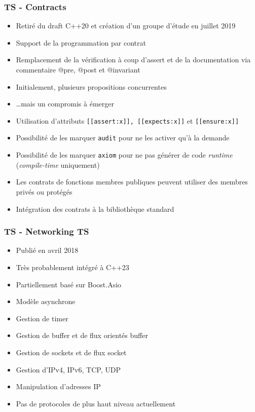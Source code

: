 \documentclass[C++.tex]{subfiles}
\begin{document}
\begin{frame}
	\frametitle{TS - Contracts}
	\begin{itemize}
		\item Retiré du draft C++20 et création d'un groupe d'étude en juillet 2019


		\item Support de la programmation par contrat
		\item Remplacement de la vérification à coup d'assert et de la documentation via commentaire @pre, @post et @invariant
		\item Initialement, plusieurs propositions \og concurrentes\fg{}
		\item \ldots{}mais un compromis à émerger
		\item Utilisation d'attributs \lstinline|[[assert:x]], |\lstinline|[[expects:x]]| et \lstinline|[[ensure:x]]|


		\item Possibilité de les marquer \lstinline|audit| pour ne les activer qu'à la demande
		\item Possibilité de les marquer \lstinline|axiom| pour ne pas générer de code \textit{runtime} (\textit{compile-time} uniquement)
		\item Les contrats de fonctions membres publiques peuvent utiliser des membres privés ou protégés
		\item Intégration des contrats à la bibliothèque standard
	\end{itemize}
\end{frame}

\begin{frame}
	\frametitle{TS - Networking TS}
	\begin{itemize}
		\item Publié en avril 2018
		\item Très probablement intégré à C++23
		\item Partiellement basé sur Boost.Asio
		\item Modèle asynchrone
		\item Gestion de timer
		\item Gestion de buffer et de flux orientés buffer
		\item Gestion de sockets et de flux \og socket\fg{}
		\item Gestion d'IPv4, IPv6, TCP, UDP
		\item Manipulation d'adresses IP
		\item Pas de protocoles de plus haut niveau actuellement
	\end{itemize}
\end{frame}
\end{document}
